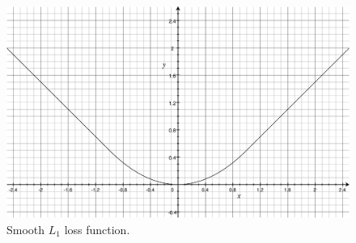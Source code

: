 \begin{figure}[!h]
	\centering
	\includegraphics[width=\fig\textwidth]{3-09.pdf}
    \caption[Smooth $L_1$ loss function]{Smooth $L_1$ loss function.}
    \label{fig:l1loss}
\end{figure}